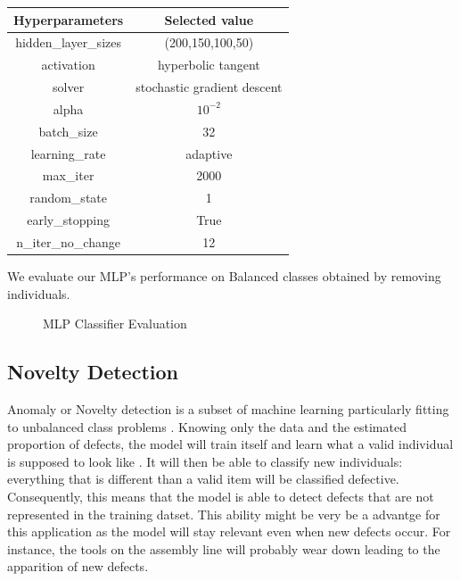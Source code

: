 \begin{center}
    \begin{tabular}{|c|c|}
        \hline
        \textbf{Hyperparameters} & \textbf{Selected value} \\ \hline
        hidden\_layer\_sizes & (200,150,100,50) \\ \hline
        activation  & hyperbolic tangent \\ \hline
        solver & stochastic gradient descent \\ \hline
        alpha & \(10^{-2}\)  \\ \hline
        batch\_size & 32 \\ \hline
        learning\_rate & adaptive \\ \hline
        max\_iter & 2000 \\ \hline
        random\_state & 1 \\ \hline
        early\_stopping & True \\ \hline
        n\_iter\_no\_change & 12\\ \hline
    \end{tabular}
\end{center}

We evaluate our MLP's performance on Balanced classes obtained by removing individuals.

\begin{figure}
    \centering
    \qquad
    \caption{MLP Classifier Evaluation}
    \label{mlp}
\end{figure}


\subsection{Novelty Detection}
Anomaly or Novelty detection is a subset of machine learning particularly fitting to unbalanced class problems \cite{novel_scikit}. Knowing only the data and the estimated proportion of defects, the model will train itself and learn what a valid individual is supposed to look like \cite{novel_yt}. It will then be able to classify new individuals: everything that is different than a valid item will be classified defective. Consequently, this means that the model is able to detect defects that are not represented in the training datset. This ability might be very be a advantge for this application as the model will stay relevant even when new defects occur. For instance, the tools on the assembly line will probably wear down leading to the apparition of new defects.